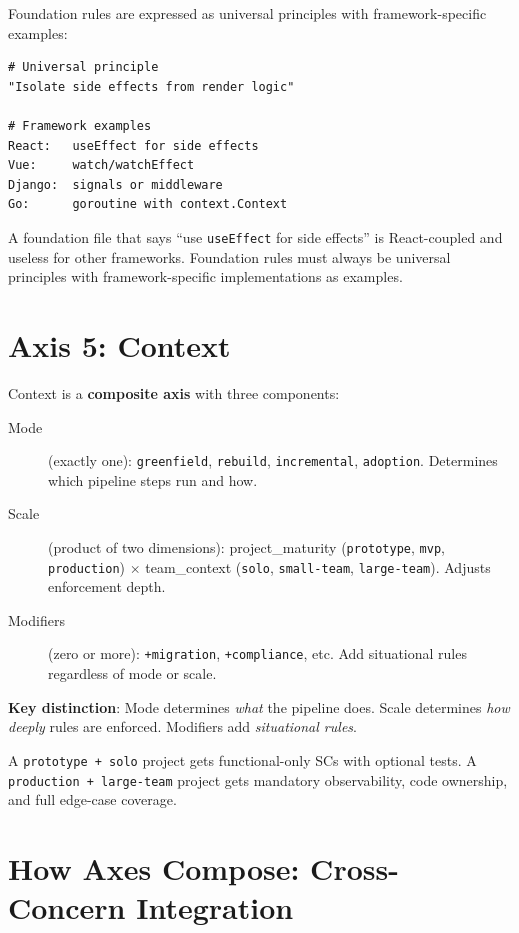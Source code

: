 \documentclass[11pt,a4paper,openright,twoside]{report}
\begin{document}
Foundation rules are expressed as universal principles with framework-specific examples:

\begin{lstlisting}[title={Foundation Rule Pattern}]
# Universal principle
"Isolate side effects from render logic"

# Framework examples
React:   useEffect for side effects
Vue:     watch/watchEffect
Django:  signals or middleware
Go:      goroutine with context.Context
\end{lstlisting}

\begin{dangerbox}
A foundation file that says ``use \texttt{useEffect} for side effects'' is React-coupled and useless for other frameworks. Foundation rules must always be universal principles with framework-specific implementations as examples.
\end{dangerbox}

\section{Axis 5: Context}

Context is a \textbf{composite axis} with three components:

\begin{description}
  \item[Mode] (exactly one): \texttt{greenfield}, \texttt{rebuild}, \texttt{incremental}, \texttt{adoption}. Determines which pipeline steps run and how.
  \item[Scale] (product of two dimensions): project\_maturity (\texttt{prototype}, \texttt{mvp}, \texttt{production}) $\times$ team\_context (\texttt{solo}, \texttt{small-team}, \texttt{large-team}). Adjusts enforcement depth.
  \item[Modifiers] (zero or more): \texttt{+migration}, \texttt{+compliance}, etc. Add situational rules regardless of mode or scale.
\end{description}

\textbf{Key distinction}: Mode determines \emph{what} the pipeline does. Scale determines \emph{how deeply} rules are enforced. Modifiers add \emph{situational rules}.

A \texttt{prototype + solo} project gets functional-only SCs with optional tests. A \texttt{production + large-team} project gets mandatory observability, code ownership, and full edge-case coverage.

\section{How Axes Compose: Cross-Concern Integration}
\end{document}
